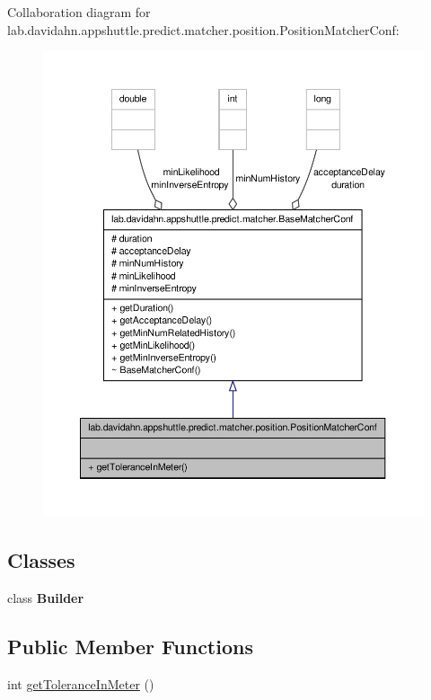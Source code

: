 \-Collaboration diagram for lab.\-davidahn.\-appshuttle.\-predict.\-matcher.\-position.\-Position\-Matcher\-Conf\-:
\nopagebreak
\begin{figure}[H]
\begin{center}
\leavevmode
\includegraphics[width=350pt]{classlab_1_1davidahn_1_1appshuttle_1_1predict_1_1matcher_1_1position_1_1_position_matcher_conf__coll__graph}
\end{center}
\end{figure}
\subsection*{\-Classes}
\begin{DoxyCompactItemize}
\item 
class {\bfseries \-Builder}
\end{DoxyCompactItemize}
\subsection*{\-Public \-Member \-Functions}
\begin{DoxyCompactItemize}
\item 
int \hyperlink{classlab_1_1davidahn_1_1appshuttle_1_1predict_1_1matcher_1_1position_1_1_position_matcher_conf_a9d181dcd4793f9981dc34d34cd0f5c29}{get\-Tolerance\-In\-Meter} ()
\end{DoxyCompactItemize}


